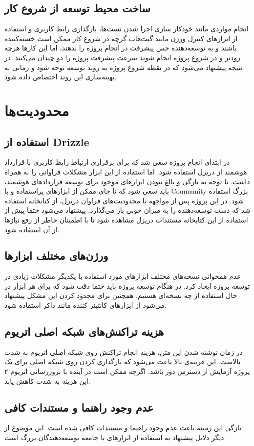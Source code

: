 \subsection{ساخت محیط توسعه از شروع کار}
انجام مواردی مانند خودکار سازی اجرا شدن تست‌ها،
بارگذاری رابط کاربری و استفاده از ابزارهای کنترل ورژن مانند گیت‌هاب
گرچه در شروع کار ممکن است خسته‌کننده باشند و به توسعه‌دهنده حس پیشرفت در انجام پروژه را ندهند، اما
این کارها هرچه زودتر و در شروع پروژه انجام شوند سرعت پیشرفت پروژه را دو چندان می‌کنند.
در نتیجه پیشنهاد می‌شود که در نقطه شروع پروژه به روند توسعه توجه شود و زمانی به
بهینه‌سازی این روند اختصاص داده شود.


\section{محدودیت‌ها}

\subsection{استفاده از
\gls{Drizzle}
}
در ابتدای انجام پروژه سعی شد که برای برقراری ارتباط رابط کاربری با قرارداد هوشمند از دریزل استفاده شود.
اما استفاده از این ابزار مشکلات فراوانی را به همراه داشت.
با توجه به تازگی و بالغ نبودن ابزارهای موجود برای توسعه قراردادهای هوشمند،
باید سعی شود که تا جای ممکن از ابزارهای پراستفاده و با
\gls{Community}
بزرگ استفاده شود. در این پروژه پس از مواجهه با محدودیت‌های فراوان دریزل،
از کتابخانه‌  استفاده شد که دست توسعه‌دهنده را به میزان خوبی باز می‌گذارد.
پیشنهاد می‌شود حتما پیش از استفاده از این کتابخانه مستندات دریزل
\cite{DrizzleDocs}
مشاهده شود تا با اطمینان خاطر از رفع نیازها از آن استفاده شود.

\subsection{ورژن‌های مختلف ابزارها}
عدم همخوانی نسخه‌های مختلف ابزارهای مورد استفاده با یکدیگر مشکلات زیادی در توسعه پروژه ایجاد کرد.
در هنگام توسعه پروژه باید حتما دقت شود که برای هر ابزار در حال استفاده از چه نسخه‌ای هستیم.
همچنین برای محدود کردن این مشکل پیشنهاد می‌شود از ابزارهای کانتینر کننده مانند داکر استفاده شود.

\subsection{هزینه تراکنش‌های شبکه اصلی اتریوم}
در زمان نوشته شدن این متن، هزینه انجام تراکنش روی شبکه اصلی اتریوم به شدت بالاست.
این هزینه‌ی بالا باعث می‌شود که بارگذاری کردن روی شبکه اصلی برای یک پروژه آزمایش از دسترس دور باشد.
اگرچه ممکن است در آینده با بروزرسانی اتریوم ۲ این هزینه به شدت کاهش یابد.

\subsection{عدم وجود راهنما و مستندات کافی}
تازگی این زمینه باعث عدم وجود راهنما و مستندات کافی شده است.
این موضوع از دیگر دلایل پیشنهاد به استفاده از ابزارهای با جامعه توسعه‌دهندگان بزرگ است.
